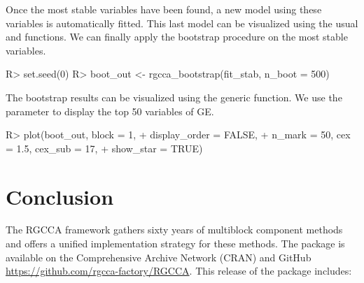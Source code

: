 \documentclass[
]{jss}
\begin{document}
\normalsize

Once the most stable variables have been found, a new model using these
variables is automatically fitted. This last model can be visualized
using the usual  and  functions. We can
finally apply the bootstrap procedure on the most stable variables.

\footnotesize

\begin{CodeChunk}
\begin{CodeInput}
R> set.seed(0)
R> boot_out <- rgcca_bootstrap(fit_stab, n_boot = 500)
\end{CodeInput}
\end{CodeChunk}

\normalsize

The bootstrap results can be visualized using the generic 
function. We use the  parameter to display the top 50
variables of GE.

\footnotesize

\begin{CodeChunk}
\begin{CodeInput}
R> plot(boot_out, block = 1,
+      display_order = FALSE,
+      n_mark = 50, cex = 1.5, cex_sub = 17,
+      show_star = TRUE)
\end{CodeInput}
\end{CodeChunk}

\normalsize

\hypertarget{conclusion}{%
\section{Conclusion}\label{conclusion}}

The RGCCA framework gathers sixty years of multiblock component methods
and offers a unified implementation strategy for these methods. The
 package is available on the Comprehensive 
Archive Network (CRAN) and GitHub
\url{https://github.com/rgcca-factory/RGCCA}. This release of the
 package includes:
\end{document}
